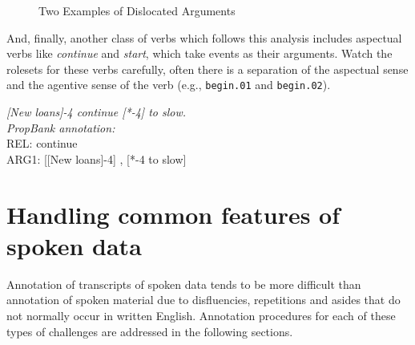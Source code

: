 \documentclass[11pt]{report}
\begin{document}
\begin{figure}[htbp]
\caption{Two Examples of Dislocated Arguments} 
\label{fig: seemex}
\end{figure}

And, finally, another class of verbs which follows this analysis includes aspectual verbs like \textit{continue} and \textit{start}, which take events as their arguments.  Watch the rolesets for these verbs carefully, often there is a separation of the aspectual sense and the agentive sense of the verb (e.g., \texttt{begin.01} and \texttt{begin.02}).  

\textit{[New loans]-4 continue [*-4] to slow.}\\
\textit{PropBank annotation:}\\
REL:	continue\\
ARG1:	[[New loans]-4] , [*-4 to slow]

\section{Handling common features of spoken data}
Annotation of transcripts of spoken data tends to be more difficult than annotation of spoken material due to disfluencies, repetitions and asides that do not normally occur in written English.  Annotation procedures for each of these types of challenges are addressed in the following sections. 
\end{document}
